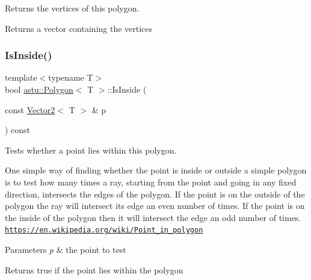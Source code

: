 Returns the vertices of this polygon.

\begin{DoxyReturn}{Returns}
a vector containing the vertices 
\end{DoxyReturn}
\mbox{\label{classastu_1_1Polygon_ae58759a339e629b9a0b2016f5a959cc1}} 
\subsubsection{\texorpdfstring{Is\+Inside()}{IsInside()}}
{\footnotesize\ttfamily template$<$typename T$>$ \\
bool \hyperlink{classastu_1_1Polygon}{astu\+::\+Polygon}$<$ T $>$\+::Is\+Inside (\begin{DoxyParamCaption}\item[{const \hyperlink{classastu_1_1Vector2}{Vector2}$<$ T $>$ \&}]{p }\end{DoxyParamCaption}) const\hspace{0.3cm}{\ttfamily [inline]}}

Tests whether a point lies within this polygon.

One simple way of finding whether the point is inside or outside a simple polygon is to test how many times a ray, starting from the point and going in any fixed direction, intersects the edges of the polygon. If the point is on the outside of the polygon the ray will intersect its edge an even number of times. If the point is on the inside of the polygon then it will intersect the edge an odd number of times. \href{https://en.wikipedia.org/wiki/Point_in_polygon}{\tt https\+://en.\+wikipedia.\+org/wiki/\+Point\+\_\+in\+\_\+polygon}


\begin{DoxyParams}{Parameters}
{\em p} & the point to test \\
\hline
\end{DoxyParams}
\begin{DoxyReturn}{Returns}
{\ttfamily true} if the point lies within the polygon 
\end{DoxyReturn}
\mbox{\label{classastu_1_1Polygon_a752836abe5a71f78c8a9debfcffc580e}} 
